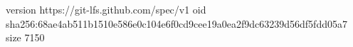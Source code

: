 version https://git-lfs.github.com/spec/v1
oid sha256:68ae4ab511b1510e586e0c104e6f0cd9cee19a0ea2f9dc63239d56df5fdd05a7
size 7150
